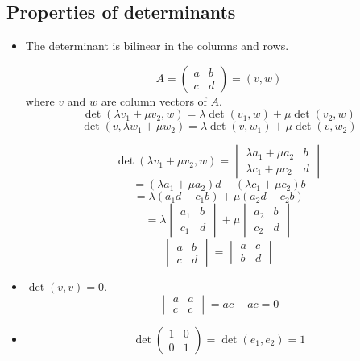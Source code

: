 \documentclass[a4paper,landscape,twocolumn]{article}
\theoremstyle{definition}
\begin{document}
\subsection{Properties of determinants}
%
\begin{itemize}
  \item The determinant is bilinear in the columns and rows.

    \[ A = \begin{pmatrix} a & b \\ c & d \end{pmatrix} = (v,w) \]
    where $v$ and $w$ are column vectors of $A$.
    \[ \det(\lambda v_1 + \mu v_2, w) = \lambda \det(v_1, w) + \mu \det(v_2, w) \]
    \[ \det(v, \lambda w_1 + \mu w_2) = \lambda \det(v, w_1) + \mu \det(v, w_2) \]

    \[
      \det(\lambda v_1 + \mu v_2, w) =
      \begin{vmatrix}
        \lambda a_1 + \mu a_2 & b \\
        \lambda c_1 + \mu c_2 & d
      \end{vmatrix}
    \] \[
      = (\lambda a_1 + \mu a_2) d - (\lambda c_1 + \mu c_2) b
    \] \[
      = \lambda (a_1 d - c_1 b) + \mu (a_2 d - c_2 b)
    \] \[
      = \lambda \begin{vmatrix} a_1 & b \\ c_1 & d \end{vmatrix}
      + \mu \begin{vmatrix} a_2 & b \\ c_2 & d \end{vmatrix}
    \]
    \[ \begin{vmatrix} a & b \\ c & d \end{vmatrix} = \begin{vmatrix} a & c \\ b & d \end{vmatrix} \]
  \item
    $\det(v,v) = 0$.
    \[ \begin{vmatrix} a & a \\ c & c \end{vmatrix} = ac - ac = 0 \]
  \item
    \[ \det\begin{pmatrix} 1 & 0 \\ 0 & 1 \end{pmatrix} = \det(e_1, e_2) = 1 \]
\end{itemize}
\end{document}
